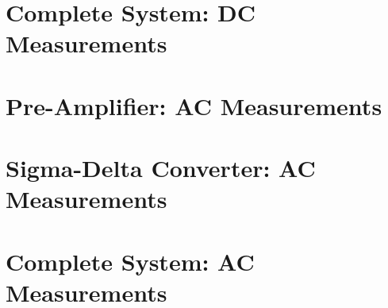 \section{Complete System: DC Measurements}
\label{sec:systemDC}

\section{Pre-Amplifier: AC Measurements}
\label{sec:preAmpAC}

\section{Sigma-Delta Converter: AC Measurements}
\label{sec:sigdelAC}

\section{Complete System: AC Measurements}
\label{sec:systemAC}
